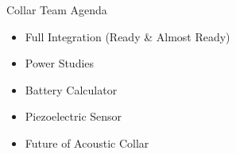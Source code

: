 




\begin{frame}{Collar Team Agenda}
    \begin{itemize}
        \item Full Integration (Ready \& Almost Ready)
        \item Power Studies
        \item Battery Calculator
        \item Piezoelectric Sensor
        \item Future of Acoustic Collar
    \end{itemize}
\end{frame}

